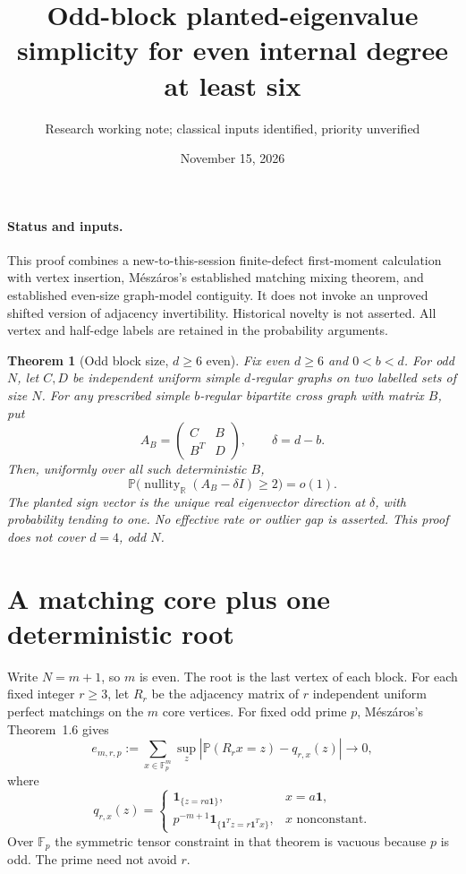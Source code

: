 \documentclass[11pt]{article}
\title{Odd-block planted-eigenvalue simplicity for even internal degree at least six}
\author{Research working note; classical inputs identified, priority unverified}
\date{November 15, 2026}
\newtheorem{theorem}{Theorem}
\newcommand{\Fp}{\mathbb F_p}
\newcommand{\one}{\mathbf1}
\newcommand{\nullity}{\operatorname{nullity}}
\newcommand{\Prb}{\mathbb P}
\begin{document}
\maketitle

\paragraph{Status and inputs.}
This proof combines a new-to-this-session finite-defect first-moment
calculation with vertex insertion, M\'esz\'aros's established matching
mixing theorem, and established even-size graph-model contiguity. It
does not invoke an unproved shifted version of adjacency invertibility.
Historical novelty is not asserted. All vertex and half-edge labels are
retained in the probability arguments.

\begin{theorem}[Odd block size, $d\ge6$ even]\label{thm:main}
Fix even $d\ge6$ and $0<b<d$. For odd $N$, let $C,D$ be independent
uniform simple $d$-regular graphs on two labelled sets of size $N$.
For any prescribed simple $b$-regular bipartite cross graph with matrix
$B$, put
\[
 A_B=\begin{pmatrix}C&B\\B^T&D\end{pmatrix},\qquad \delta=d-b.
\]
Then, uniformly over all such deterministic $B$,
\[
 \Prb\bigl(\nullity_{\mathbb R}(A_B-\delta I)\ge2\bigr)=o(1).
\]
The planted sign vector is the unique real eigenvector direction at
$\delta$, with probability tending to one. No effective rate or outlier
gap is asserted. This proof does not cover $d=4$, odd $N$.
\end{theorem}

\section{A matching core plus one deterministic root}
Write $N=m+1$, so $m$ is even. The root is the last vertex of each block.
For each fixed integer $r\ge3$, let $R_r$ be the adjacency matrix of
$r$ independent uniform perfect matchings on the $m$ core vertices.
For fixed odd prime $p$, M\'esz\'aros's Theorem~1.6 gives
\[
 e_{m,r,p}:=\sum_{x\in\Fp^m}\sup_z
 \left|\Prb(R_rx=z)-q_{r,x}(z)\right|\longrightarrow0,
\]
where
\[
 q_{r,x}(z)=
 \begin{cases}
 \boldsymbol1_{\{z=ra\one\}},&x=a\one,\\
 p^{-m+1}\boldsymbol1_{\{\one^Tz=r\one^Tx\}},&x\text{ nonconstant}.
 \end{cases}
\]
Over $\Fp$ the symmetric tensor constraint in that theorem is vacuous
because $p$ is odd. The prime need not avoid $r$.
\end{document}
